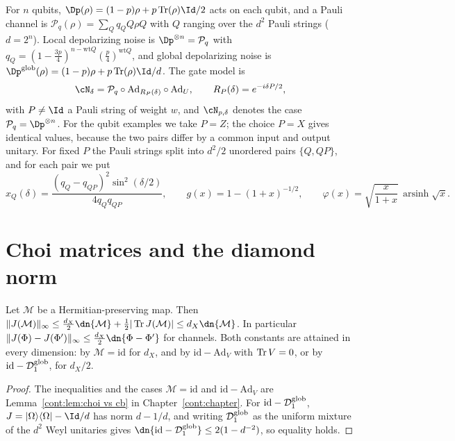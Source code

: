For $n$ qubits, $\Dp(\rho)=(1-p)\rho+p\Tr(\rho)\Id/2$ acts on each qubit, and a Pauli channel is $\mathcal P_q(\rho)=\sum_Qq_QQ\rho Q$ with $Q$ ranging over the $d^2$ Pauli strings ($d=2^n$). Local depolarizing noise is $\Dp^{\otimes n}=\mathcal P_q$ with $q_Q=(1-\frac{3p}{4})^{n-\mathrm{wt}Q}(\frac p4)^{\mathrm{wt}Q}$, and global depolarizing noise is $\Dp^{\rm glob}(\rho)=(1-p)\rho+p\Tr(\rho)\Id/d$. The gate model is
\begin{equation}\label{gate:eq:Sgate}
\cN_\delta=\mathcal P_q\circ\mathrm{Ad}_{R_P(\delta)}\circ\mathrm{Ad}_U,\qquad R_P(\delta)=e^{-i\delta P/2},
\end{equation}
with $P\ne\Id$ a Pauli string of weight $w$, and $\cN_{p,\delta}$ denotes the case $\mathcal P_q=\Dp^{\otimes n}$. For the qubit examples we take $P=Z$; the choice $P=X$ gives identical values, because the two pairs differ by a common input and output unitary. For fixed $P$ the Pauli strings split into $d^2/2$ unordered pairs $\{Q,QP\}$, and for each pair we put
\begin{equation}\label{gate:eq:Sx}
x_Q(\delta)=\frac{(q_Q-q_{QP})^2\sin^2(\delta/2)}{4q_Qq_{QP}},\qquad g(x)=1-(1+x)^{-1/2},\qquad \varphi(x)=\sqrt{\frac{x}{1+x}}\,\operatorname{arsinh}\sqrt x .
\end{equation}

\section{Choi matrices and the diamond norm}\label{gate:sec:lemJ}

\begin{lemma}\label{gate:lem:J}
Let $\mathcal M$ be a Hermitian-preserving map. Then $\|J(\mathcal M)\|_\infty\le\frac{d_X}{2}\dn{\mathcal M}+\frac12|\Tr J(\mathcal M)|\le d_X\dn{\mathcal M}$. In particular $\|J(\Phi)-J(\Phi')\|_\infty\le\frac{d_X}{2}\dn{\Phi-\Phi'}$ for channels. Both constants are attained in every dimension: by $\mathcal M=\mathrm{id}$ for $d_X$, and by $\mathrm{id}-\mathrm{Ad}_V$ with $\operatorname{Tr} V=0$, or by $\mathrm{id}-\mathcal D^{\rm glob}_1$, for $d_X/2$.
\end{lemma}

\begin{proof}
The inequalities and the cases $\mathcal M=\mathrm{id}$ and $\mathrm{id}-\mathrm{Ad}_V$ are Lemma~\ref{cont:lem:choi vs cb} in Chapter~\ref{cont:chapter}.
For $\mathrm{id}-\mathcal D_1^{\rm glob}$, $J=|\Omega\rangle\langle\Omega|-\Id/d$ has norm $d-1/d$, and writing $\mathcal D_1^{\rm glob}$ as the uniform mixture of the $d^2$ Weyl unitaries gives $\dn{\mathrm{id}-\mathcal D_1^{\rm glob}}\le2(1-d^{-2})$, so equality holds.
\end{proof}


